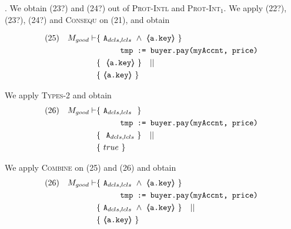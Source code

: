 \begin{proofO}
. 
We obtain (23?) and (24?) out of \textsc{Prot-Intl} and \textsc{Prot-Int}$_1$. 
We apply (22?), (23?), (24?) and \textsc{Consequ} on (21), and obtain

\begin{align*}
\text{(25)} \ \ \ M_{good} \vdash & \{ \ \Alocals \   \wedge\    {\inside{\prg{a.key}}}\  \} \\
		  		& \SPT  \prg{tmp := buyer.pay(myAccnt, price)}\ \\  
		  		& \{ \ \   {\inside{\prg{a.key}}} \ \} \ \ \  || \ \ \  \\
		  		&   \{ \   {\inside{\prg{a.key}}}\  \}
\end{align*}
\normalsize

We apply \textsc{Types-2} and obtain
\begin{align*}
\text{(26)} \ \ \ M_{good} \vdash & \{ \ \mbox{\normalfont{\texttt{A}}}_{dcls,lcls} \  \  \} \\
		  		& ~ \strut \hspace{.9cm}  \mbox{\normalfont{\texttt{tmp := buyer.pay(myAccnt, price)}}}\ \\  
		  		& \{ \ \   \mbox{\normalfont{\texttt{A}}}_{dcls,lcls}  \ \} \ \ \  || \ \ \  \\
		  		&   \{ \  true \  \}
\end{align*}
\normalsize

We apply \textsc{Combine} on (25) and (26) and obtain
\begin{align*}
\text{(26)} \ \ \ M_{good} \vdash & \{ \ \Alocals \   \wedge\    {\inside{\prg{a.key}}}\  \} \\
		  		& \SPT  \prg{tmp := buyer.pay(myAccnt, price)}\ \\  
		  		& \{ \ \Alocals \   \wedge\    {\inside{\prg{a.key}}}\  \}\ \ \  || \ \ \  \\
		  		&    \{ \   {\inside{\prg{a.key}}}\  \}
\end{align*}
\normalsize



\end{proofO}
